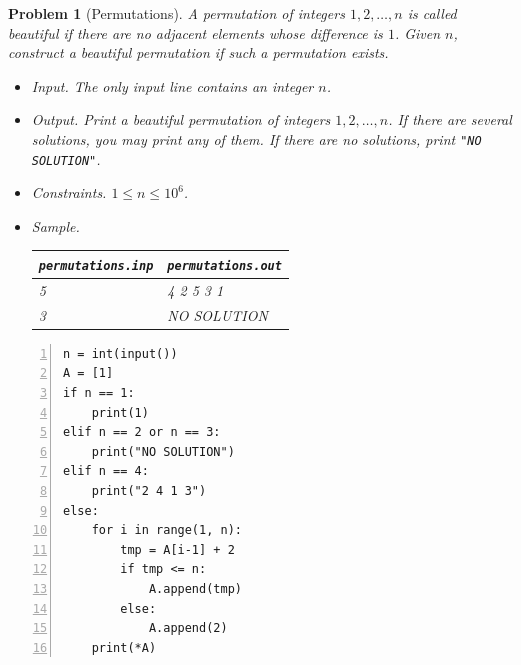 \documentclass{article}
\newtheorem{problem}{Problem}
\begin{document}
\begin{problem}[Permutations]
	A permutation of integers $1,2,\ldots,n$ is called \emph{beautiful} if there are no adjacent elements whose difference is $1$. Given $n$, construct a beautiful permutation if such a permutation exists.
	\begin{itemize}
		\item {\sf Input.} The only input line contains an integer $n$.
		\item {\sf Output.} Print a beautiful permutation of integers $1,2,\ldots,n$. If there are several solutions, you may print any of them. If there are no solutions, print \verb|"NO SOLUTION"|.
		\item {\sf Constraints.} $1\le n\le10^6$.
		\item {\sf Sample.}
		\begin{table}[H]
			\centering
			\begin{tabular}{|l|l|}
				\hline
				\verb|permutations.inp| & \verb|permutations.out| \\
				\hline
				5 & 4 2 5 3 1 \\
				\hline
				3 & NO SOLUTION \\
				\hline
			\end{tabular}
		\end{table}
	\end{itemize}
\end{problem}

\begin{Verbatim}[numbers=left,xleftmargin=5mm]
n = int(input())
A = [1]
if n == 1:
    print(1)
elif n == 2 or n == 3:
    print("NO SOLUTION")
elif n == 4:
    print("2 4 1 3")
else:
    for i in range(1, n):
        tmp = A[i-1] + 2
        if tmp <= n:
            A.append(tmp)
        else:
            A.append(2)
    print(*A)
\end{Verbatim}
\end{document}
